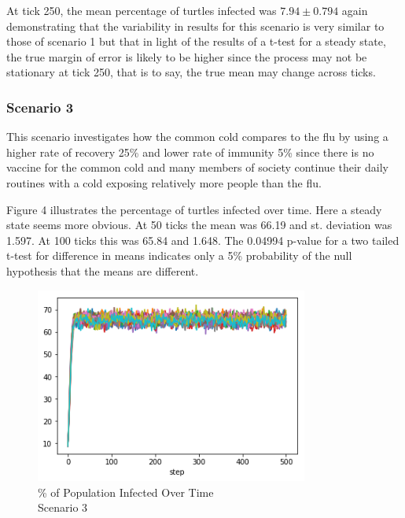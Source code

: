 \documentclass[11pt]{article} %
\begin{document}

At tick 250, the mean percentage of turtles infected was $7.94 \pm 0.794$ again demonstrating that the variability in results for this scenario is very similar to those of scenario 1 but that in light of the results of a t-test for a steady state, the true margin of error is likely to be higher since the process may not be stationary at tick 250, that is to say, the true mean may change across ticks.  

\subsubsection{Scenario 3}


This scenario investigates how the common cold compares to the flu by using a higher rate of recovery 25\% and lower rate of immunity 5\% since there is no vaccine for the common cold and many members of society continue their daily routines with a cold exposing relatively more people than the flu. 


Figure 4 illustrates the percentage of turtles infected over time. Here a steady state seems more obvious. At 50 ticks the mean was 66.19 and st. deviation was 1.597. At 100 ticks this was 65.84 and 1.648. The 0.04994 p-value for a two tailed t-test for difference in means indicates only a 5\% probability of the null hypothesis that the means are different.

\begin{figure}
\centering
\includegraphics[width=0.8\textwidth]{20-runs-scenario-3-steady-state}
\caption{\% of Population Infected Over Time \\ Scenario 3}
\end{figure}
\end{document}
